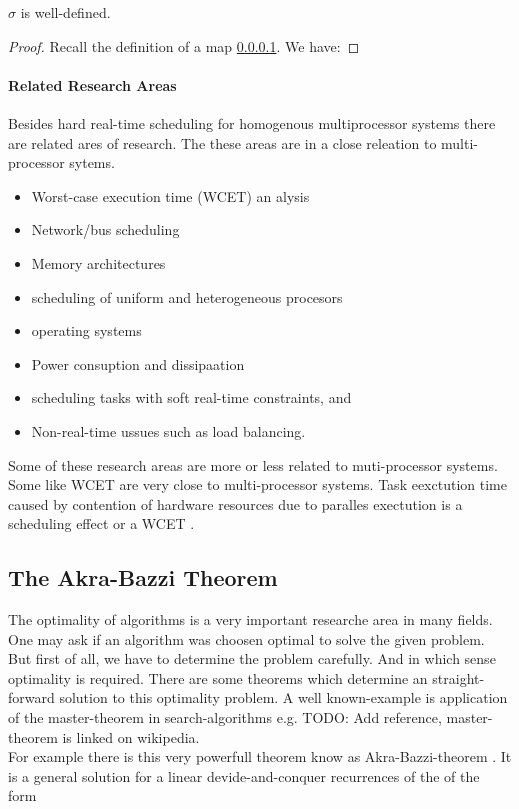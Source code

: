 \begin{lemma}
 $\sigma$ is well-defined.
\end{lemma}
\begin{proof}
Recall the definition of a map \ref{}. We have:
\end{proof}

\paragraph{Related Research Areas}
Besides hard real-time scheduling for homogenous multiprocessor systems there are related ares of research. The these areas are in a  close releation to multi-processor sytems.
\begin{itemize}
\item Worst-case execution time (WCET) an alysis
\item Network/bus scheduling
\item Memory architectures
\item scheduling of uniform and heterogeneous procesors
\item operating systems
\item Power consuption and dissipaation
\item scheduling tasks with soft real-time constraints, and
\item Non-real-time ussues such as load balancing.
\end{itemize}
Some of these research areas are more or less related to muti-processor systems. Some like WCET are very close to multi-processor systems.
Task eexctution time caused by contention of hardware resources due to paralles exectution is a scheduling effect or a WCET \cite[Sec. 10.2]{DB2011}.
 
\subsection{The Akra-Bazzi Theorem}
\label{subsection:The Akra-Bazzi Theorem}
The optimality of algorithms is a very important researche area in many fields.
One may ask if an algorithm was choosen optimal to solve the given problem.
But first of all, we have to determine the problem carefully. And in which sense optimality is required. There are some theorems which determine an straight-forward solution to this optimality problem. A well known-example is application of the master-theorem in search-algorithms e.g. \cite {}TODO: Add reference, master-theorem is linked on wikipedia.\\
For example there is this very powerfull theorem know as Akra-Bazzi-theorem \cite{AB98}.
It is a general solution for a linear devide-and-conquer recurrences of the of the form

